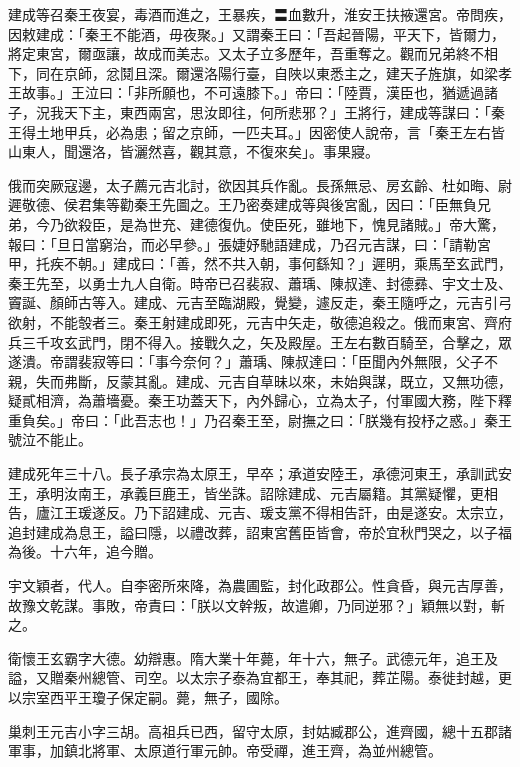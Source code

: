 \begin{pinyinscope}
 建成等召秦王夜宴，毒酒而進之，王暴疾，〓血數升，淮安王扶掖還宮。帝問疾，因敕建成：「秦王不能酒，毋夜聚。」又謂秦王曰：「吾起晉陽，平天下，皆爾力，將定東宮，爾亟讓，故成而美志。又太子立多歷年，吾重奪之。觀而兄弟終不相下，同在京師，忿鬩且深。爾還洛陽行臺，自陜以東悉主之，建天子旌旗，如梁孝王故事。」王泣曰：「非所願也，不可遠膝下。」帝曰：「陸賈，漢臣也，猶遞過諸子，況我天下主，東西兩宮，思汝即往，何所悲邪？」王將行，建成等謀曰：「秦王得土地甲兵，必為患；留之京師，一匹夫耳。」因密使人說帝，言「秦王左右皆山東人，聞還洛，皆灑然喜，觀其意，不復來矣」。事果寢。



 俄而突厥寇邊，太子薦元吉北討，欲因其兵作亂。長孫無忌、房玄齡、杜如晦、尉遲敬德、侯君集等勸秦王先圖之。王乃密奏建成等與後宮亂，因曰：「臣無負兄弟，今乃欲殺臣，是為世充、建德復仇。使臣死，雖地下，愧見諸賊。」帝大驚，報曰：「旦日當窮治，而必早參。」張婕妤馳語建成，乃召元吉謀，曰：「請勒宮甲，托疾不朝。」建成曰：「善，然不共入朝，事何繇知？」遲明，乘馬至玄武門，秦王先至，以勇士九人自衛。時帝已召裴寂、蕭瑀、陳叔達、封德彞、宇文士及、竇誕、顏師古等入。建成、元吉至臨湖殿，覺變，遽反走，秦王隨呼之，元吉引弓欲射，不能彀者三。秦王射建成即死，元吉中矢走，敬德追殺之。俄而東宮、齊府兵三千攻玄武門，閉不得入。接戰久之，矢及殿屋。王左右數百騎至，合擊之，眾遂潰。帝謂裴寂等曰：「事今奈何？」蕭瑀、陳叔達曰：「臣聞內外無限，父子不親，失而弗斷，反蒙其亂。建成、元吉自草昧以來，未始與謀，既立，又無功德，疑貳相濟，為蕭墻憂。秦王功蓋天下，內外歸心，立為太子，付軍國大務，陛下釋重負矣。」帝曰：「此吾志也！」乃召秦王至，尉撫之曰：「朕幾有投杼之惑。」秦王號泣不能止。



 建成死年三十八。長子承宗為太原王，早卒；承道安陸王，承德河東王，承訓武安王，承明汝南王，承義巨鹿王，皆坐誅。詔除建成、元吉屬籍。其黨疑懼，更相告，廬江王瑗遂反。乃下詔建成、元吉、瑗支黨不得相告訐，由是遂安。太宗立，追封建成為息王，謚曰隱，以禮改葬，詔東宮舊臣皆會，帝於宜秋門哭之，以子福為後。十六年，追今贈。



 宇文穎者，代人。自李密所來降，為農圃監，封化政郡公。性貪昏，與元吉厚善，故豫文乾謀。事敗，帝責曰：「朕以文幹叛，故遣卿，乃同逆邪？」穎無以對，斬之。



 衛懷王玄霸字大德。幼辯惠。隋大業十年薨，年十六，無子。武德元年，追王及謚，又贈秦州總管、司空。以太宗子泰為宜都王，奉其祀，葬芷陽。泰徙封越，更以宗室西平王瓊子保定嗣。薨，無子，國除。



 巢刺王元吉小字三胡。高祖兵已西，留守太原，封姑臧郡公，進齊國，總十五郡諸軍事，加鎮北將軍、太原道行軍元帥。帝受禪，進王齊，為並州總管。




\end{pinyinscope}
